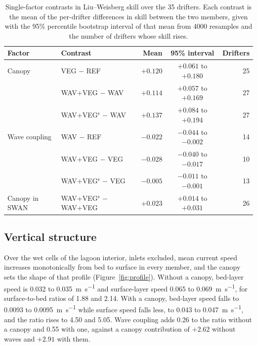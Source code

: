 \begin{table}[H]
  \centering
  \caption{Single-factor contrasts in Liu--Weisberg skill over the 35
  drifters. Each contrast is the mean of the per-drifter differences in skill
  between the two members, given with the 95\% percentile bootstrap interval
  of that mean from 4000 resamples and the number of drifters whose skill
  rises.}
  \label{tab:contrasts}
  \begin{tabular}{llrcr}
    \toprule
    Factor & Contrast & Mean & 95\% interval & Drifters \\
    \midrule
    Canopy & VEG $-$ REF & $+0.120$ & $+0.061$ to $+0.180$ & 25 \\
           & WAV+VEG $-$ WAV     & $+0.114$ & $+0.057$ to $+0.169$ & 27 \\
           & WAV+VEG$^{\mathrm{s}}$ $-$ WAV & $+0.137$ & $+0.084$ to $+0.194$ & 27 \\
    \midrule
    Wave coupling & WAV $-$ REF & $-0.022$ & $-0.044$ to $-0.002$ & 14 \\
           & WAV+VEG $-$ VEG     & $-0.028$ & $-0.040$ to $-0.017$ & 10 \\
           & WAV+VEG$^{\mathrm{s}}$ $-$ VEG & $-0.005$ & $-0.011$ to $-0.001$ & 13 \\
    \midrule
    Canopy in SWAN & WAV+VEG$^{\mathrm{s}}$ $-$ WAV+VEG & $+0.023$ & $+0.014$ to $+0.031$ & 26 \\
    \bottomrule
  \end{tabular}
\end{table}

\subsection{Vertical structure}
\label{sec:res_3d}

Over the wet cells of the lagoon interior, inlets excluded, mean current speed
increases monotonically from bed to surface in every member, and the canopy
sets the shape of that profile (Figure~\ref{fig:profile}). Without a canopy,
bed-layer speed is 0.032 to 0.035~\si{\metre\per\second} and surface-layer
speed 0.065 to 0.069~\si{\metre\per\second}, for surface-to-bed ratios of 1.88
and 2.14. With a canopy, bed-layer speed falls to 0.0093 to
0.0095~\si{\metre\per\second} while surface speed falls less, to 0.043 to
0.047~\si{\metre\per\second}, and the ratio rises to 4.50 and 5.05. Wave
coupling adds 0.26 to the ratio without a canopy and 0.55 with one, against a
canopy contribution of $+2.62$ without waves and $+2.91$ with them.


